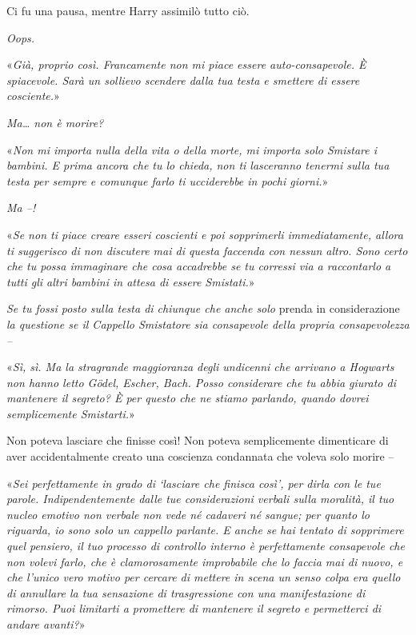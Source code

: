 Ci fu una pausa, mentre Harry assimilò tutto ciò.

\textit{Oops.}

«\textit{Già, proprio così. Francamente non mi piace essere auto-consapevole. È spiacevole. Sarà un sollievo scendere dalla tua testa e smettere di essere cosciente.}»

\textit{Ma… non è morire?}

«\textit{Non mi importa nulla della vita o della morte, mi importa solo Smistare i bambini. E prima ancora che tu lo chieda, non ti lasceranno tenermi sulla tua testa per sempre e comunque farlo ti ucciderebbe in pochi giorni.}»

\textit{Ma –!}

«\textit{Se non ti piace creare esseri coscienti e poi sopprimerli immediatamente, allora ti suggerisco di non discutere mai di questa faccenda con nessun altro. Sono certo che tu possa immaginare che cosa accadrebbe se tu corressi via a raccontarlo a tutti gli altri bambini in attesa di essere Smistati.}»

\textit{Se tu fossi posto sulla testa di chiunque che anche solo} prenda in considerazione \textit{la questione se il Cappello Smistatore sia consapevole della propria consapevolezza –}

«\textit{Sì, sì. Ma la stragrande maggioranza degli undicenni che arrivano a Hogwarts non hanno letto Gödel, Escher, Bach. Posso considerare che tu abbia giurato di mantenere il segreto? È per questo che ne stiamo parlando, quando dovrei semplicemente Smistarti.}»

Non poteva lasciare che finisse così! Non poteva semplicemente dimenticare di aver accidentalmente creato una coscienza condannata che voleva solo morire –

«\textit{Sei perfettamente in grado di ‘lasciare che finisca così’, per dirla con le tue parole. Indipendentemente dalle tue considerazioni verbali sulla moralità, il tuo nucleo emotivo non verbale non vede né cadaveri né sangue; per quanto lo riguarda, io sono solo un cappello parlante. E anche se hai tentato di sopprimere quel pensiero, il tuo processo di controllo interno è perfettamente consapevole che non volevi farlo, che è clamorosamente improbabile che lo faccia mai di nuovo, e che l’unico vero motivo per cercare di mettere in scena un senso colpa era quello di annullare la tua sensazione di trasgressione con una manifestazione di rimorso. Puoi limitarti a promettere di mantenere il segreto e permetterci di andare avanti?}»

